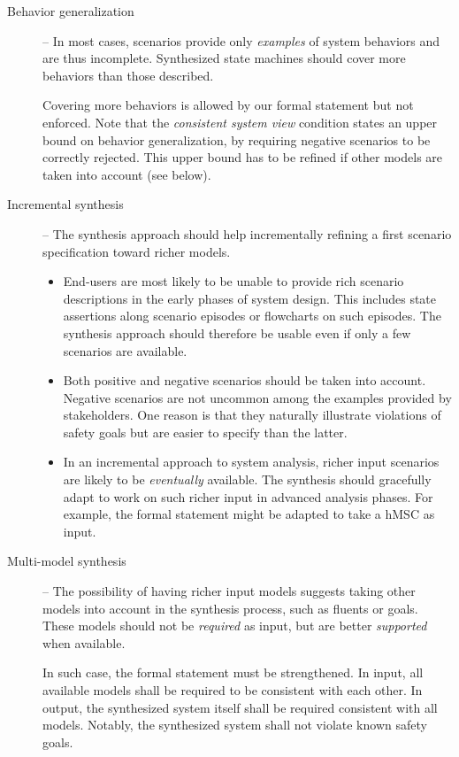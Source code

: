 \begin{description}
\item[Behavior generalization] -- In most cases, scenarios provide only \emph{examples} of system behaviors and are thus incomplete. Synthesized state machines should cover more behaviors than those described. 

Covering more behaviors is allowed by our formal statement but not enforced. Note that the \emph{consistent system view} condition states an upper bound on behavior generalization, by requiring negative scenarios to be correctly rejected. This upper bound has to be refined if other models are taken into account (see below).

\item[Incremental synthesis] -- The synthesis approach should help incrementally refining a first scenario specification toward richer models.
\begin{itemize}

\item End-users are most likely to be unable to provide rich scenario descriptions in the early phases of system design. This includes state assertions along scenario episodes or flowcharts on such episodes. The synthesis approach should therefore be usable even if only a few scenarios are available.

\item Both positive and negative scenarios should be taken into account. Negative scenarios are not uncommon among the examples provided by stakeholders. One reason is that they naturally illustrate violations of safety goals but are easier to specify than the latter.

\item In an incremental approach to system analysis, richer input scenarios are likely to be \emph{eventually} available. The synthesis should gracefully adapt to work on such richer input in advanced analysis phases. For example, the formal statement might be adapted to take a hMSC as input. 

\end{itemize}

\item[Multi-model synthesis] -- The possibility of having richer input models suggests taking other models into account in the synthesis process, such as fluents or goals. These models should not be \emph{required} as input, but are better \emph{supported} when available. 

In such case, the formal statement must be strengthened. In input, all available models shall be required to be consistent with each other. In output, the synthesized system itself shall be required consistent with all models. Notably, the synthesized system shall not violate known safety goals.

\end{description}

